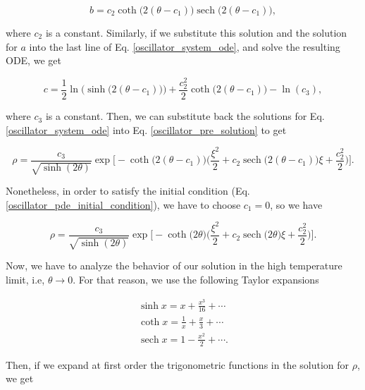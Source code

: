 \documentclass{article}
\DeclareMathOperator{\sech}{sech}
\begin{document}
\begin{equation}
    b = c_{2} \coth \big( 2(\theta - c_{1}) \big) \sech \big( 2(\theta - c_{1}) \big),
\end{equation}

where $c_{2}$ is a constant. Similarly, if we substitute this solution and the solution for $a$ into the last line of Eq. \ref{oscillator_system_ode}, and solve the resulting ODE, we get

\begin{equation}
    c = \frac{1}{2} \ln \Big(\sinh \big( 2(\theta - c_{1}) \big) \Big) + \frac{c_{2}^{2}}{2} \coth \big( 2(\theta - c_{1}) \big) - \ln (c_{3}),
\end{equation}

where $c_{3}$ is a constant. Then, we can substitute back the solutions for Eq. \ref{oscillator_system_ode} into Eq. \ref{oscillator_pre_solution} to get

\begin{equation}
    \rho = \frac{c_{3}}{\sqrt{\sinh(2\theta)}} \exp \bigg[ -\coth \big(2(\theta - c_{1})) \bigg( \frac{\xi^{2}}{2} + c_{2} \sech \big( 2(\theta - c_{1}) \big)\xi + \frac{c_{2}^{2}}{2} \bigg) \bigg]. 
\end{equation}

Nonetheless, in order to satisfy the initial condition (Eq. \ref{oscillator_pde_initial_condition}), we have to choose $c_{1}=0$, so we have

\begin{equation}
    \rho = \frac{c_{3}}{\sqrt{\sinh(2\theta)}} \exp \bigg[ -\coth \big(2\theta) \bigg( \frac{\xi^{2}}{2} + c_{2} \sech \big( 2\theta \big)\xi + \frac{c_{2}^{2}}{2} \bigg) \bigg]. 
\end{equation}

Now, we have to analyze the behavior of our solution in the high temperature limit, i.e, $\theta \longrightarrow 0$. For that reason, we use the following Taylor expansions

\begin{equation}
    \begin{split}
        \sinh x = x + \frac{x^{3}}{16} + \cdots \\ \coth x = \frac{1}{x} + \frac{x}{3} + \cdots \\ \sech x = 1 - \frac{x^{2}}{2} + \cdots.
    \end{split}
\end{equation}

Then, if we expand at first order the trigonometric functions in the solution for $\rho$, we get
\end{document}
